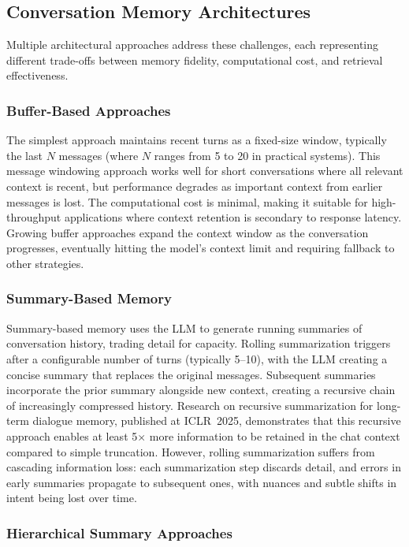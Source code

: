 \documentclass[11pt,letterpaper]{article}
\begin{document}
\subsection{Conversation Memory Architectures}

Multiple architectural approaches address these challenges, each representing different trade-offs between memory fidelity, computational cost, and retrieval effectiveness.

\subsubsection{Buffer-Based Approaches}

The simplest approach maintains recent turns as a fixed-size window, typically the last $N$ messages (where $N$ ranges from 5 to 20 in practical systems). This message windowing approach works well for short conversations where all relevant context is recent, but performance degrades as important context from earlier messages is lost. The computational cost is minimal, making it suitable for high-throughput applications where context retention is secondary to response latency. Growing buffer approaches expand the context window as the conversation progresses, eventually hitting the model's context limit and requiring fallback to other strategies.

\subsubsection{Summary-Based Memory}

Summary-based memory uses the LLM to generate running summaries of conversation history, trading detail for capacity. Rolling summarization triggers after a configurable number of turns (typically 5--10), with the LLM creating a concise summary that replaces the original messages. Subsequent summaries incorporate the prior summary alongside new context, creating a recursive chain of increasingly compressed history. Research on recursive summarization for long-term dialogue memory, published at ICLR~2025, demonstrates that this recursive approach enables at least 5$\times$ more information to be retained in the chat context compared to simple truncation. However, rolling summarization suffers from cascading information loss: each summarization step discards detail, and errors in early summaries propagate to subsequent ones, with nuances and subtle shifts in intent being lost over time.

\subsubsection{Hierarchical Summary Approaches}
\end{document}
